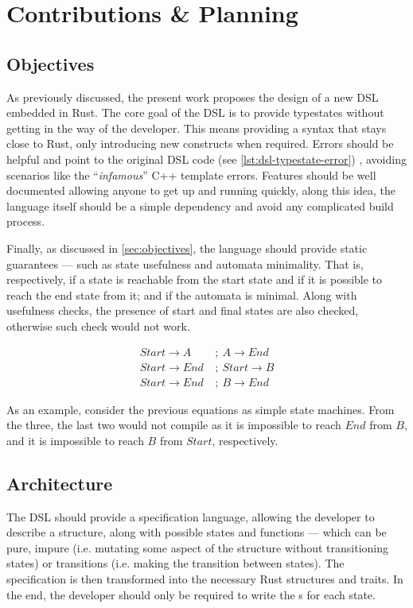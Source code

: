 \chapter{Contributions \& Planning}\label{cha:planning}

\section{Objectives}

As previously discussed, the present work proposes the design of a new DSL embedded in Rust.
The core goal of the DSL is to provide typestates without getting in the way of the developer.
This means providing a syntax that stays close to Rust, only introducing new constructs when required.
Errors should be helpful and point to the original DSL code (see \autoref{lst:dsl-typestate-error})
, avoiding scenarios like the “\emph{infamous}” C++ template errors.
Features should be well documented allowing anyone to get up and running quickly,
along this idea, the language itself should be a simple dependency and avoid any complicated build process.

Finally, as discussed in \autoref{sec:objectives}, the language should provide static guarantees ---
such as state usefulness and automata minimality.
That is, respectively, if a state is reachable from the start state and if it is possible to reach the end state from it;
and if the automata is minimal.
Along with usefulness checks, the presence of start and final states are also checked,
otherwise such check would not work.

\begin{align}
    Start \rightarrow A~   & ;~A \rightarrow End   \\
    Start \rightarrow End~ & ;~Start \rightarrow B \\
    Start \rightarrow End~ & ;~B \rightarrow End
\end{align}

As an example, consider the previous equations as simple state machines.
From the three, the last two would not compile as it is impossible to reach $End$ from $B$, and it is impossible to reach $B$ from $Start$, respectively.

\section{Architecture}\label{sec:arch}

The DSL should provide a specification language,
allowing the developer to describe a structure, along with possible states and functions ---
which can be pure, impure (i.e. mutating some aspect of the structure without transitioning states)
or transitions (i.e. making the transition between states).
The specification is then transformed into the necessary Rust structures and traits.
In the end, the developer should only be required to write the s for each state.

